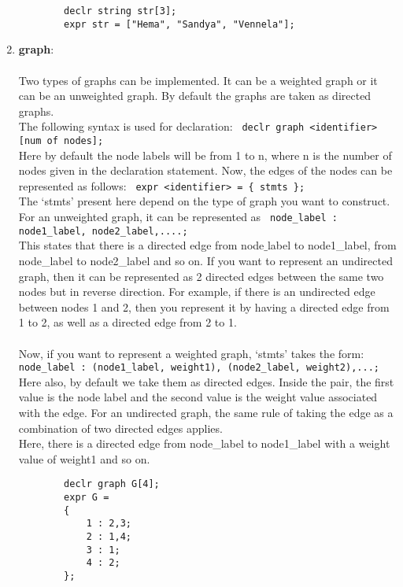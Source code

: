 \documentclass[journal, 18pt]{report}
\begin{document}
\begin{enumerate}
\begin{lstlisting}
        declr string str[3];
        expr str = ["Hema", "Sandya", "Vennela"];
    \end{lstlisting}
    \item \textbf{graph}:\\\\ Two types of graphs can be implemented. It can be a weighted graph or it can be an unweighted graph. By default the graphs are taken as directed graphs.\\
    The following syntax is used for declaration: \texttt{ declr graph <identifier>[num of nodes];}\\
    Here by default the node labels will be from 1 to n, where n is the number of nodes given in the declaration statement.
    Now, the edges of the nodes can be represented as follows: \texttt{ expr <identifier> = \{ stmts \};}\\
    The `stmts' present here depend on the type of graph you want to construct. For an unweighted graph, it can be represented as \texttt{ node\_label : node1\_label, node2\_label,....;}\\
    This states that there is a directed edge from node$\_$label to node1\_label, from node\_label to node2\_label and so on. If you want to represent an undirected graph, then it can be represented as 2 directed edges between the same two nodes but in reverse direction. For example, if there is an undirected edge between nodes 1 and 2, then you represent it by having a directed edge from 1 to 2, as well as a directed edge from 2 to 1.\\\\
    Now, if you want to represent a weighted graph, `stmts' takes the form: \texttt{ node\_label : (node1\_label, weight1), (node2\_label, weight2),...;}\\
    Here also, by default we take them as directed edges. Inside the pair, the first value is the node label and the second value is the weight value associated with the edge. For an undirected graph, the same rule of taking the edge as a combination of two directed edges applies.\\
    Here, there is a directed edge from node\_label to node1\_label with a weight value of weight1 and so on.\\
    \begin{lstlisting}
        declr graph G[4]; 
        expr G = 
        {
            1 : 2,3;
            2 : 1,4;
            3 : 1;
            4 : 2;
        };


\end{lstlisting}
\end{enumerate}
\end{document}
